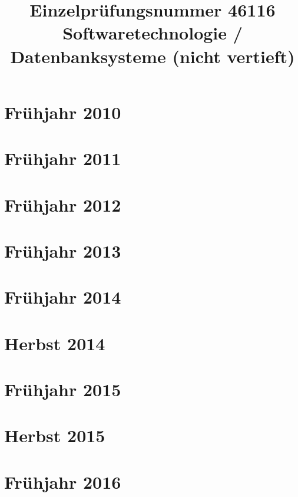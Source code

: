 \documentclass{lehramt-informatik-examen-sammlung}
\title{Einzelprüfungsnummer 46116\\Softwaretechnologie / Datenbanksysteme (nicht vertieft)}
\begin{document}
\maketitle
\tableofcontents

\section{Frühjahr 2010}


\section{Frühjahr 2011}


\section{Frühjahr 2012}


\section{Frühjahr 2013}


\section{Frühjahr 2014}


\section{Herbst 2014}


\section{Frühjahr 2015}


\section{Herbst 2015}


\section{Frühjahr 2016}

\end{document}
